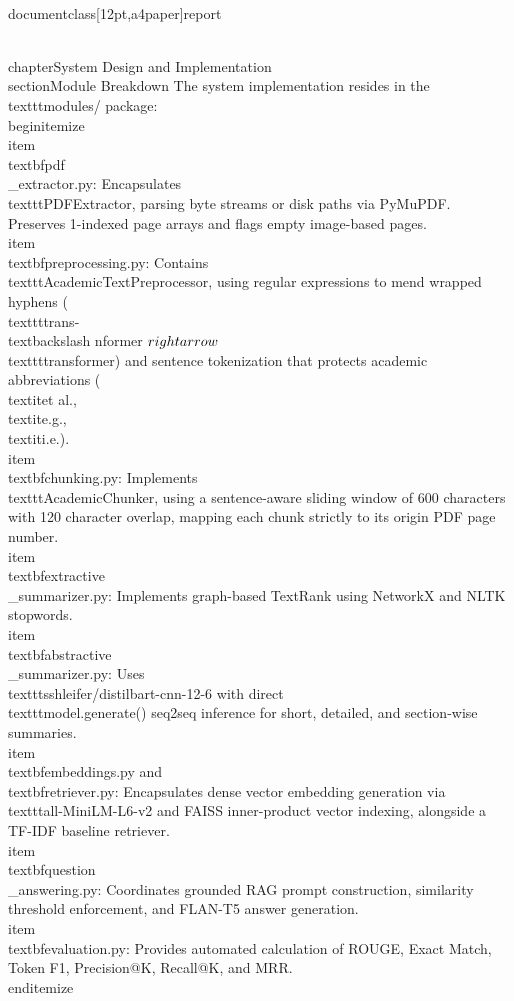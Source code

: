 \\documentclass[12pt,a4paper]{report}
\begin{document}
\\chapter{System Design and Implementation}
\\section{Module Breakdown}
The system implementation resides in the \\texttt{modules/} package:
\\begin{itemize}
    \\item \\textbf{pdf\\_extractor.py:} Encapsulates \\texttt{PDFExtractor}, parsing byte streams or disk paths via PyMuPDF. Preserves 1-indexed page arrays and flags empty image-based pages.
    \\item \\textbf{preprocessing.py:} Contains \\texttt{AcademicTextPreprocessor}, using regular expressions to mend wrapped hyphens (\\texttt{trans-\\textbackslash nformer} $\\rightarrow$ \\texttt{transformer}) and sentence tokenization that protects academic abbreviations (\\textit{et al.}, \\textit{e.g.}, \\textit{i.e.}).
    \\item \\textbf{chunking.py:} Implements \\texttt{AcademicChunker}, using a sentence-aware sliding window of 600 characters with 120 character overlap, mapping each chunk strictly to its origin PDF page number.
    \\item \\textbf{extractive\\_summarizer.py:} Implements graph-based TextRank using NetworkX and NLTK stopwords.
    \\item \\textbf{abstractive\\_summarizer.py:} Uses \\texttt{sshleifer/distilbart-cnn-12-6} with direct \\texttt{model.generate()} seq2seq inference for short, detailed, and section-wise summaries.
    \\item \\textbf{embeddings.py} and \\textbf{retriever.py:} Encapsulates dense vector embedding generation via \\texttt{all-MiniLM-L6-v2} and FAISS inner-product vector indexing, alongside a TF-IDF baseline retriever.
    \\item \\textbf{question\\_answering.py:} Coordinates grounded RAG prompt construction, similarity threshold enforcement, and FLAN-T5 answer generation.
    \\item \\textbf{evaluation.py:} Provides automated calculation of ROUGE, Exact Match, Token F1, Precision@K, Recall@K, and MRR.
\\end{itemize}
\end{document}
